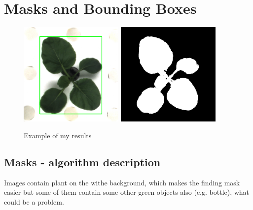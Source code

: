 \documentclass[12pt]{article}
\begin{document}
\newpage

\section{Masks and Bounding Boxes}

\begin{center}
\begin{figure}[h!]
\centering
\includegraphics[width = 2in]{box_00_02_009_02.png}
\hspace{1cm}
\includegraphics[width = 2in]{rgb_00_02_009_02.png}
\caption{
Example of my results
}
\end{figure}
\end{center}

\subsection{Masks - algorithm description}

Images contain plant on the withe background, which makes the finding mask easier but some of them contain some other green objects also (e.g. bottle), what could be a problem.
\end{document}
